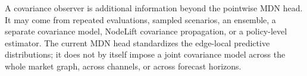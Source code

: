 A covariance observer is additional information beyond the pointwise MDN head.
It may come from repeated evaluations, sampled scenarios, an ensemble, a
separate covariance model, NodeLift covariance propagation, or a policy-level
estimator.  The current MDN head standardizes the edge-local predictive
distributions; it does not by itself impose a joint covariance model across the
whole market graph, across channels, or across forecast horizons.

